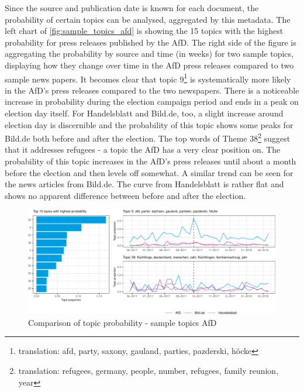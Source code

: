 \documentclass[
]{article}
\begin{document}
Since the source and publication date is known for each document, the
probability of certain topics can be analysed, aggregated by this
metadata. The left chart of \autoref{fig:sample_topics_afd} is showing
the 15 topics with the highest probability for press releases published
by the AfD. The right side of the figure is aggregating the probability
by source and time (in weeks) for two sample topics, displaying how they
change over time in the AfD press releases compared to two sample news
papers. It becomes clear that topic 9\footnote{translation: afd, party,
  saxony, gauland, parties, pazderski, höcke} is systematically more
likely in the AfD's press releases compared to the two newspapers. There
is a noticeable increase in probability during the election campaign
period and ends in a peak on election day itself. For Handelsblatt and
Bild.de, too, a slight increase around election day is discernible and
the probability of this topic shows some peaks for Bild.de both before
and after the election. The top words of Theme 38\footnote{translation:
  refugees, germany, people, number, refugees, family reunion, year}
suggest that it addresses refugees - a topic the AfD has a very clear
position on. The probability of this topic increases in the AfD's press
releases until about a month before the election and then levels off
somewhat. A similar trend can be seen for the news articles from
Bild.de. The curve from Handelsblatt is rather flat and shows no
apparent difference between before and after the election.

\begin{figure}

{\centering \includegraphics[width=1\linewidth]{main_text_files/figure-latex/Top AfD topics-1} 

}

\caption{Comparison of topic probability - sample topics AfD \label{fig:sample_topics_afd}}\label{fig:Top AfD topics}
\end{figure}
\end{document}
